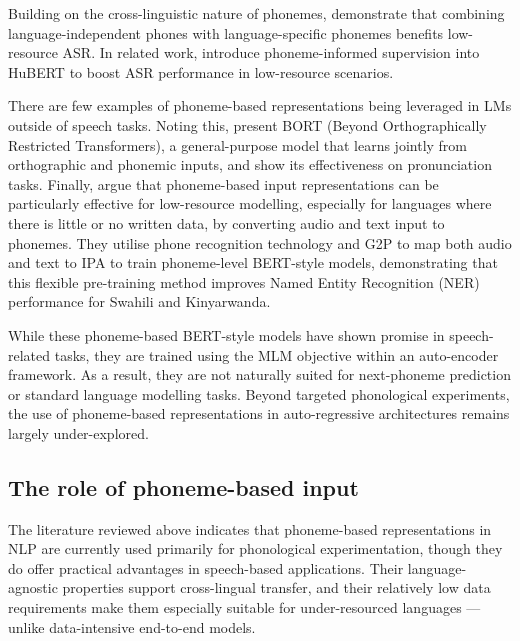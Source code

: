 Building on the cross-linguistic nature of phonemes, \citet{li2020universal} demonstrate that combining language-independent phones with language-specific phonemes benefits low-resource ASR. In related work, \citet{feng-2023-language-universal-phonetic} introduce phoneme-informed supervision into HuBERT to boost ASR performance in low-resource scenarios.

There are few examples of phoneme-based representations being leveraged in LMs outside of speech tasks. Noting this, \citet{gale-etal-2023-bort} present BORT (Beyond Orthographically Restricted Transformers), a general-purpose model that learns jointly from orthographic and phonemic inputs, and show its effectiveness on pronunciation tasks. Finally, \citet{leong-2022-phone} argue that phoneme-based input representations can be particularly effective for low-resource modelling, especially for languages where there is little or no written data, by converting audio and text input to phonemes. They utilise phone recognition technology and G2P to map both audio and text to IPA to train phoneme-level BERT-style models, demonstrating that this flexible pre-training method improves Named Entity Recognition (NER) performance for Swahili and Kinyarwanda. 


While these phoneme-based BERT-style models have shown promise in speech-related tasks, they are trained using the MLM objective within an auto-encoder framework. As a result, they are not naturally suited for next-phoneme prediction or standard language modelling tasks. Beyond targeted phonological experiments, the use of phoneme-based representations in auto-regressive architectures remains largely under-explored.

\subsection{The role of phoneme-based input}\label{sec:12-phoneval}

The literature reviewed above indicates that phoneme-based representations in NLP are currently used primarily for phonological experimentation, though they do offer practical advantages in speech-based applications. Their language-agnostic properties support cross-lingual transfer, and their relatively low data requirements make them especially suitable for under-resourced languages --- unlike data-intensive end-to-end models.

